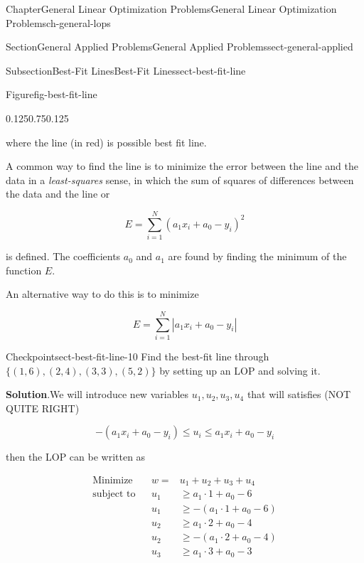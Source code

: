 \documentclass[oneside,10pt,]{book}
\newcommand{\blocktitlefont}{\relax}
\numberwithin{equation}{section}
\newcommand{\amp}{&}
\begin{document}
\begin{chapterptx}{Chapter}{General Linear Optimization Problems}{}{General Linear Optimization Problems}{}{}{ch-general-lops}
\begin{sectionptx}{Section}{General Applied Problems}{}{General Applied Problems}{}{}{sect-general-applied}
\begin{subsectionptx}{Subsection}{Best-Fit Lines}{}{Best-Fit Lines}{}{}{sect-best-fit-line}
\begin{figureptx}{Figure}{}{fig-best-fit-line}{}
\begin{image}{0.125}{0.75}{0.125}{}
{\begin{tikzpicture}[domain=-1:7]
\end{tikzpicture}%
}%
\end{image}%
\tcblower
\end{figureptx}%
where the line (in red) is possible best fit line.%
\par
A common way to find the line is to minimize the error between the line and the data in a \emph{least-squares} sense, in which the sum of squares of differences between the data and the line or%
\par
%
\begin{equation*}
E = \sum_{i=1}^N (a_1 x_i +a_0 - y_i)^2
\end{equation*}
%
\par
is defined.  The coefficients \(a_0\) and \(a_1\) are found by finding the minimum of the function \(E\).%
\par
An alternative way to do this is to minimize%
\par
%
\begin{equation}
E = \sum_{i=1}^N |a_1 x_i + a_0 - y_i |\label{eq-line-min}
\end{equation}
%
\begin{inlineexercise}{Checkpoint}{}{sect-best-fit-line-10}%
Find the best-fit line through  \(\{(1,6), (2,4), (3,3), (5,2)\}\) by setting up an LOP and solving it.%
\par\smallskip%
\noindent\textbf{\blocktitlefont Solution}.\hypertarget{sect-best-fit-line-10-2}{}\quad{}We will introduce new variables \(u_1, u_2, u_3, u_4 \) that will satisfies  (NOT QUITE RIGHT)%
\par
%
\begin{equation*}
-(a_1 x_i + a_0 - y_i) \leq u_i \leq a_1 x_i + a_0 - y_i
\end{equation*}
%
\par
then the LOP can be written as%
\par
%
\begin{equation*}
\begin{aligned}
\text{Minimize} \amp \amp w = \amp  u_1 + u_2 + u_3 + u_4 \\
\text{subject to} \amp \amp u_1 \amp \geq a_1 \cdot 1 + a_0 - 6 \\
\amp \amp u_1 \amp \geq -(a_1 \cdot 1 + a_0 - 6) \\
\amp \amp u_2 \amp \geq a_1 \cdot 2 + a_0 - 4 \\
\amp \amp u_2 \amp \geq -(a_1 \cdot 2 + a_0 - 4) \\
\amp \amp u_3 \amp \geq a_1 \cdot 3 + a_0 -3 \\

\end{aligned}
\end{equation*}
\end{inlineexercise}
\end{subsectionptx}
\end{sectionptx}
\end{chapterptx}
\end{document}
